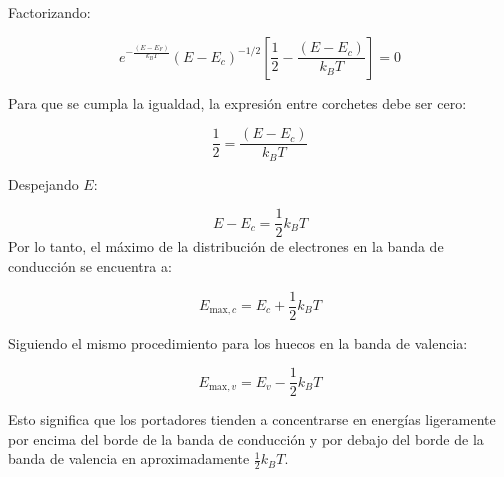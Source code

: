 \begin{enumerate}[label=\alph*)]
		Factorizando:
		
		\[
		e^{-\frac{(E - E_F)}{k_B T}} (E - E_c)^{-1/2} \left[ \frac{1}{2} - \frac{(E - E_c)}{k_B T} \right] = 0
		\]
		
		Para que se cumpla la igualdad, la expresión entre corchetes debe ser cero:
		
		\[
		\frac{1}{2} = \frac{(E - E_c)}{k_B T}
		\]
		
		Despejando \( E \):
		
		\[
		E - E_c = \frac{1}{2} k_B T
		\]
		Por lo tanto, el máximo de la distribución de electrones en la banda de conducción se encuentra a:
		
		\[
		E_{\text{max}, c} = E_c + \frac{1}{2} k_B T
		\]
		
		Siguiendo el mismo procedimiento para los huecos en la banda de valencia:
		
		\[
		E_{\text{max}, v} = E_v - \frac{1}{2} k_B T
		\]
		
		Esto significa que los portadores tienden a concentrarse en energías ligeramente por encima del borde de la banda de conducción y por debajo del borde de la banda de valencia en aproximadamente \( \frac{1}{2} k_B T \).
		
	\end{enumerate}
